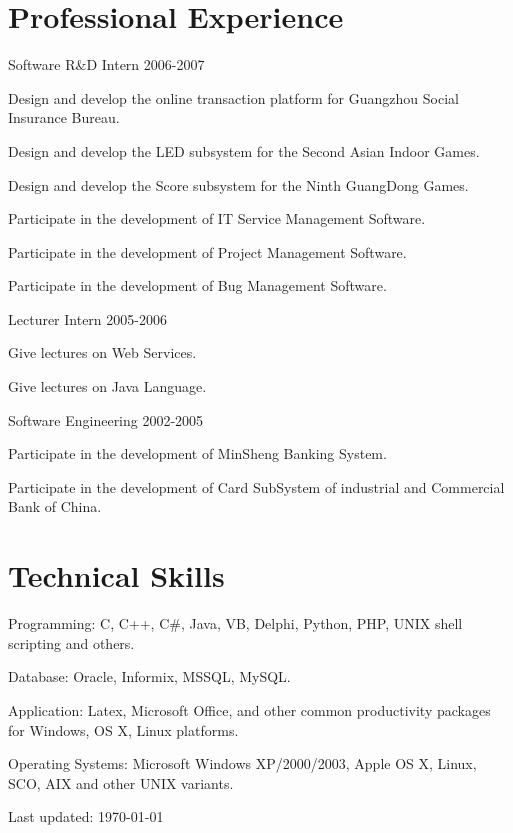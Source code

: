 \documentclass[10pt,letterpaper]{article}
\def\footerlink{}
\renewenvironment{itemize}{
  \begin{list}{}{
    \setlength{\leftmargin}{1.5em}
  }
}{
  \end{list}
}
\begin{document}
\section*{Professional Experience}

Software R\&D Intern 2006-2007
\begin{itemize} 
\item Design and develop the online transaction platform for Guangzhou Social Insurance Bureau.
\item Design and develop the LED subsystem for the Second Asian Indoor Games.
\item Design and develop the Score subsystem for the Ninth GuangDong Games.
\item Participate in the development of IT Service Management Software.
\item Participate in the development of Project Management Software.
\item Participate in the development of Bug Management Software.
\end{itemize} 
Lecturer Intern 2005-2006
\begin{itemize}
\item Give lectures on Web Services.
\item Give lectures on Java Language.
\end{itemize} 
Software Engineering 2002-2005
\begin{itemize}
\item Participate in the development of MinSheng Banking System.
\item Participate in the development of Card SubSystem of industrial and Commercial Bank of China.
\end{itemize} 

\section*{Technical Skills}
\begin {itemize}
\item Programming: C, C++, C\#, Java, VB, Delphi, Python, PHP, UNIX shell scripting and others.
\item Database: Oracle, Informix, MSSQL, MySQL.
\item Application: Latex, Microsoft Office, and other common productivity packages for Windows, OS X, Linux platforms.
\item Operating Systems: Microsoft Windows XP/2000/2003, Apple OS X, Linux, SCO, AIX and other UNIX variants.
\end {itemize}

\begin{center}
  \begin{footnotesize}
    Last updated: \today \\
    \href{\footerlink}{\texttt{\footerlink}}
  \end{footnotesize}
\end{center}
\end{document}
